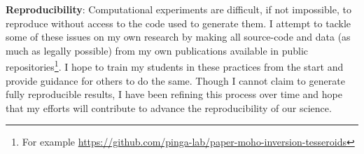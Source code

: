\documentclass[12pt,notitlepage]{article}
\begin{document}
\textbf{Reproducibility}:
Computational experiments
are difficult, if not impossible, to reproduce
without access to the code used to generate them.
%
I attempt to tackle
some of these issues
on my own research
by making all source-code and data
(as much as legally possible)
from my own publications
available in public repositories\footnote{For example \url{https://github.com/pinga-lab/paper-moho-inversion-tesseroids}}.
%
I hope to train my students
in these practices from the start
and provide guidance for others to do the same.
%
Though I cannot claim
to generate fully reproducible results,
I have been refining this process over time
and hope that my efforts will contribute
to advance the reproducibility of our science.
\end{document}
